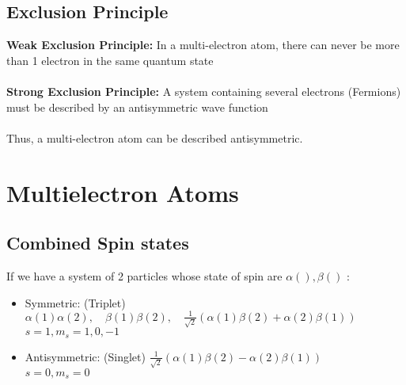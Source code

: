 \documentclass{myclass}
\begin{document}
\subsection{Exclusion Principle}
\textbf{Weak Exclusion Principle:} In a multi-electron atom, there can never be more than 1 electron in the same quantum state\\
\\
\textbf{Strong Exclusion Principle:} A system containing several electrons (Fermions) must be described by an antisymmetric wave function \\
\\
Thus, a multi-electron atom can be described antisymmetric.





\section{Multielectron Atoms}
\subsection{Combined Spin states}
If we have a system of 2 particles whose state of spin are $\alpha(), \beta()$ :
\begin{itemize}
  \item Symmetric: (Triplet) $\alpha(1)\alpha(2), \quad \beta(1)\beta(2), \quad \frac{1}{\sqrt{2} }\left( \alpha(1)\beta(2) + \alpha(2)\beta(1) \right)  $ \\
	$s=1, m_s = 1, 0, -1$
  \item Antisymmetric: (Singlet) $\frac{1}{\sqrt{2} }\left( \alpha(1)\beta(2)-\alpha(2)\beta(1) \right) $ \\
	$s=0, m_s = 0$
\end{itemize}
\end{document}
